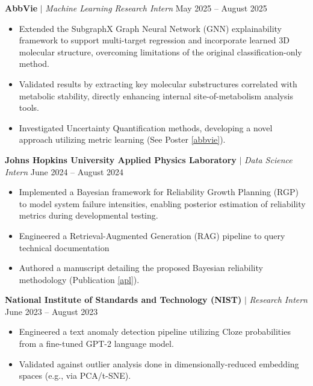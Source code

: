 \documentclass[letterpaper,10pt]{article}
\begin{document}
\textbf{AbbVie} $|$ \textit{Machine Learning Research Intern} \hfill May 2025 -- August 2025\vspace{-5pt}
\begin{itemize}[itemsep=-5pt, parsep=5pt, leftmargin=0.25in] \item Extended the SubgraphX Graph Neural Network (GNN) explainability framework to support multi-target regression and incorporate learned 3D molecular structure, overcoming limitations of the original classification-only method. 
\item Validated results by extracting key molecular substructures correlated with metabolic stability, directly enhancing internal site-of-metabolism analysis tools. 
\item Investigated Uncertainty Quantification methods, developing a novel approach utilizing metric learning (See Poster \ref{abbvie}). \end{itemize}

\textbf{Johns Hopkins University Applied Physics Laboratory} $|$ \textit{Data Science Intern} \hfill June 2024 -- August 2024\vspace{-5pt}
\begin{itemize}[itemsep=-5pt, parsep=5pt, leftmargin=0.25in] 
\item Implemented a Bayesian framework for Reliability Growth Planning (RGP) to model system failure intensities, enabling posterior estimation of reliability metrics during developmental testing. 
\item Engineered a Retrieval-Augmented Generation (RAG) pipeline to query technical documentation 
\item Authored a manuscript detailing the proposed Bayesian reliability methodology (Publication \ref{apl}). 
\end{itemize}

\textbf{National Institute of Standards and Technology (NIST)} $|$ \textit{Research Intern} \hfill June 2023 -- August 2023\vspace{-5pt}
\begin{itemize}[itemsep=-5pt, parsep=5pt, leftmargin=0.25in] \item Engineered a text anomaly detection pipeline utilizing Cloze probabilities from a fine-tuned GPT-2 language model. \item Validated against outlier analysis done in dimensionally-reduced embedding spaces (e.g., via PCA/t-SNE). \end{itemize}
\end{document}
